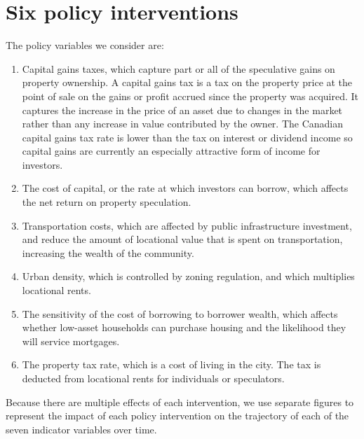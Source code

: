\section{Six policy interventions}

The policy variables we consider are: 
\begin{enumerate}
\item Capital gains taxes, which capture part or all of the speculative gains on property ownership.  A \gls{capital gains tax}  is a tax on the property price at the point of sale on the gains or profit accrued since the property was acquired. It captures the increase in the price of an asset due to changes in the market rather than any increase in value contributed by the owner. The Canadian capital gains tax rate is lower than the tax on interest or dividend income so capital gains are currently an especially attractive form of income for investors.
\item The cost of capital, or the rate at which investors can borrow, which affects the net return on property speculation.
\item Transportation costs, which are affected by public infrastructure investment, and reduce the amount of locational value that is spent on transportation, increasing the wealth of the community. 
\item Urban density, which is controlled by zoning regulation, and which multiplies locational rents. 
\item The sensitivity of the cost of borrowing to borrower wealth, which affects whether low-asset households can purchase housing and the likelihood they will service mortgages.
\item The property tax rate, which is a cost of living in the city. The tax is deducted from locational rents for individuals or speculators.
\end{enumerate}


Because there are multiple effects of each intervention, we use separate figures to represent the impact of each policy intervention on the trajectory of each of the seven indicator variables over time. %


